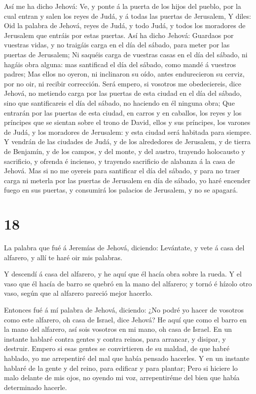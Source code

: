  Así me ha dicho Jehová: Ve, y ponte á la puerta de los
hijos del pueblo, por la cual entran y salen los reyes de Judá, y á
todas las puertas de Jerusalem,  Y diles: Oid la palabra de
Jehová, reyes de Judá, y todo Judá, y todos los moradores de Jerusalem
que entráis por estas puertas.  Así ha dicho Jehová:
Guardaos por vuestras vidas, y no traigáis carga en el día del sábado,
para meter por las puertas de Jerusalem;  Ni saquéis carga
de vuestras casas en el día del sábado, ni hagáis obra alguna: mas
santificad el día del sábado, como mandé á vuestros padres;
 Mas ellos no oyeron, ni inclinaron su oído, antes
endurecieron su cerviz, por no oir, ni recibir corrección. 
Será empero, si vosotros me obedeciereis, dice Jehová, no metiendo carga
por las puertas de esta ciudad en el día del sábado, sino que
santificareis el día del sábado, no haciendo en él ninguna obra;
 Que entrarán por las puertas de esta ciudad, en carros y
en caballos, los reyes y los príncipes que se sientan sobre el trono de
David, ellos y sus príncipes, los varones de Judá, y los moradores de
Jerusalem: y esta ciudad será habitada para siempre.  Y
vendrán de las ciudades de Judá, y de los alrededores de Jerusalem, y de
tierra de Benjamín, y de los campos, y del monte, y del austro, trayendo
holocausto y sacrificio, y ofrenda é incienso, y trayendo sacrificio de
alabanza á la casa de Jehová.  Mas si no me oyereis para
santificar el día del sábado, y para no traer carga ni meterla por las
puertas de Jerusalem en día de sábado, yo haré encender fuego en sus
puertas, y consumirá los palacios de Jerusalem, y no se apagará.

\hypertarget{section-17}{%
\section{18}\label{section-17}}

 La palabra que fué á Jeremías de Jehová, diciendo:
 Levántate, y vete á casa del alfarero, y allí te haré oir
mis palabras.

 Y descendí á casa del alfarero, y he aquí que él hacía obra
sobre la rueda.  Y el vaso que él hacía de barro se quebró
en la mano del alfarero; y tornó é hízolo otro vaso, según que al
alfarero pareció mejor hacerlo.

 Entonces fué á mí palabra de Jehová, diciendo: 
¿No podré yo hacer de vosotros como este alfarero, oh casa de Israel,
dice Jehová? He aquí que como el barro en la mano del alfarero, así sois
vosotros en mi mano, oh casa de Israel.  En un instante
hablaré contra gentes y contra reinos, para arrancar, y disipar, y
destruir.  Empero si esas gentes se convirtieren de su
maldad, de que habré hablado, yo me arrepentiré del mal que había
pensado hacerles.  Y en un instante hablaré de la gente y
del reino, para edificar y para plantar;  Pero si hiciere
lo malo delante de mis ojos, no oyendo mi voz, arrepentiréme del bien
que había determinado hacerle.

